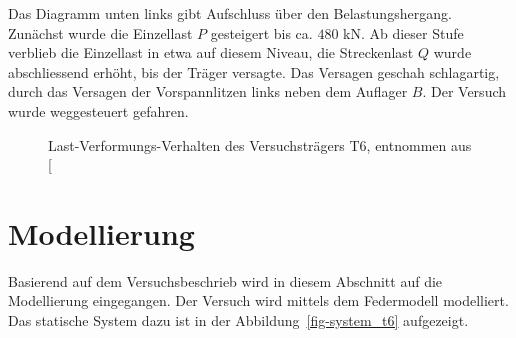 \documentclass[
  11pt,
  letterpaper,
]{scrreprt}
\begin{document}
Das Diagramm unten links gibt Aufschluss über den Belastungshergang.
Zunächst wurde die Einzellast \(P\) gesteigert bis ca. \(480\) kN. Ab
dieser Stufe verblieb die Einzellast in etwa auf diesem Niveau, die
Streckenlast \(Q\) wurde abschliessend erhöht, bis der Träger versagte.
Das Versagen geschah schlagartig, durch das Versagen der Vorspannlitzen
links neben dem Auflager \(B\). Der Versuch wurde weggesteuert gefahren.

\begin{figure}[H]


\caption{\label{fig-durchbiegung_t6}Last-Verformungs-Verhalten des
Versuchsträgers T6, entnommen aus
{[}\citeproc{ref-sigrist_versuche_1993}{5}{]}}

\end{figure}%

\section{Modellierung}\label{modellierung-2}

Basierend auf dem Versuchsbeschrieb wird in diesem Abschnitt auf die
Modellierung eingegangen. Der Versuch wird mittels dem Federmodell
modelliert. Das statische System dazu ist in der
Abbildung~\ref{fig-system_t6} aufgezeigt.
\end{document}
